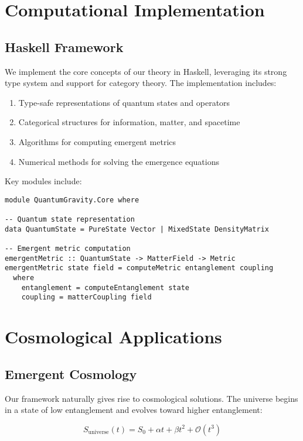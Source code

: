\documentclass[12pt,a4paper]{article}
\begin{document}
\section{Computational Implementation}

\subsection{Haskell Framework}

We implement the core concepts of our theory in Haskell, leveraging its strong type system and support for category theory. The implementation includes:

\begin{enumerate}
\item Type-safe representations of quantum states and operators
\item Categorical structures for information, matter, and spacetime
\item Algorithms for computing emergent metrics
\item Numerical methods for solving the emergence equations
\end{enumerate}

Key modules include:

\begin{lstlisting}
module QuantumGravity.Core where

-- Quantum state representation
data QuantumState = PureState Vector | MixedState DensityMatrix

-- Emergent metric computation
emergentMetric :: QuantumState -> MatterField -> Metric
emergentMetric state field = computeMetric entanglement coupling
  where
    entanglement = computeEntanglement state
    coupling = matterCoupling field
\end{lstlisting}

\section{Cosmological Applications}

\subsection{Emergent Cosmology}

Our framework naturally gives rise to cosmological solutions. The universe begins in a state of low entanglement and evolves toward higher entanglement:

\begin{equation}
S_{\text{universe}}(t) = S_0 + \alpha t + \beta t^2 + \mathcal{O}(t^3)
\end{equation}
\end{document}

